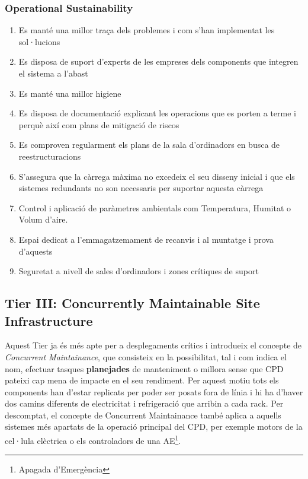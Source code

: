 \documentclass[11pt,a4paper,titlepage]{article}
\begin{document}
    \subsubsection{Operational Sustainability}
    \begin{enumerate}[nolistsep, label=\alph*.]
    \item Es manté una millor traça dels problemes i com s'han implementat les sol·lucions
    \item Es disposa de suport d'experts de les empreses dels components que integren el sistema a l'abast
    \item Es manté una millor higiene
    \item Es disposa de documentació explicant les operacions que es porten a terme i perquè així com plans de mitigació de riscos
    \item Es comproven regularment els plans de la sala d'ordinadors en busca de reestructuracions
    \item S'assegura que la càrrega màxima no excedeix el seu disseny inicial i que els sistemes redundants no son necessaris per suportar aquesta càrrega
    \item Control i aplicació de paràmetres ambientals com Temperatura, Humitat o Volum d'aire.
    \item Espai dedicat a l'emmagatzemament de recanvis i al muntatge i prova d'aquests
    \item Seguretat a nivell de sales d'ordinadors i zones crítiques de suport
    \end{enumerate}
    
    \subsection{Tier III: Concurrently Maintainable Site Infrastructure}
    Aquest Tier ja és més apte per a desplegaments crítics i introdueix el concepte de \textit{Concurrent Maintainance},  que consisteix en la possibilitat, tal i com indica el nom, efectuar tasques \textbf{planejades} de manteniment o millora sense que CPD pateixi cap mena de impacte en el seu rendiment. Per aquest motiu tots els components han d'estar replicats per poder ser posats fora de línia i hi ha d'haver dos camins diferents de electricitat i refrigeració que arribin a cada rack. Per descomptat, el concepte de Concurrent Maintainance també aplica a aquells sistemes més apartats de la operació principal del CPD, per exemple motors de la cel·lula elèctrica o els controladors de una AE\footnote{Apagada d'Emergència}.
    \newpage
\end{document}
